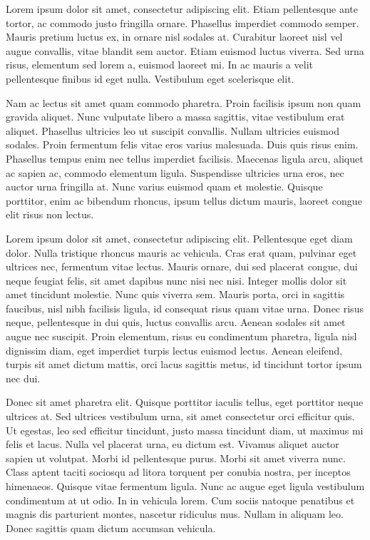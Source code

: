 \documentclass{article}
\begin{document}
\beginnumbering
\autopar

{Lorem ipsum dolor sit amet}{}, consectetur adipiscing elit.
 Etiam pellentesque ante tortor, ac commodo justo fringilla ornare.
 Phasellus imperdiet commodo semper.
 Mauris pretium luctus ex, in ornare nisl sodales at.
 Curabitur laoreet nisl vel augue convallis, vitae blandit sem auctor.
 Etiam euismod luctus viverra.
 Sed urna risus, elementum sed lorem a, euismod laoreet mi.
 In ac mauris a velit pellentesque finibus id eget nulla.
 Vestibulum eget scelerisque elit.

 {Nam}{} ac lectus sit amet quam commodo pharetra.
 Proin facilisis ipsum non quam gravida aliquet.
 Nunc vulputate libero a massa sagittis, vitae vestibulum erat aliquet.
 Phasellus ultricies leo ut suscipit convallis.
 Nullam ultricies euismod sodales.
 Proin fermentum felis vitae eros varius malesuada.
 Duis quis risus enim.
 Phasellus tempus enim nec tellus imperdiet facilisis.
 Maecenas ligula arcu, aliquet ac sapien ac, commodo elementum ligula.
 Suspendisse ultricies urna eros, nec auctor urna fringilla at.
 Nunc varius euismod quam et molestie.
 Quisque porttitor, enim ac bibendum rhoncus, ipsum tellus dictum mauris, laoreet congue elit risus non lectus.

 
Lorem ipsum dolor sit amet, consectetur adipiscing elit.
 Pellentesque eget diam dolor.
 Nulla tristique rhoncus mauris ac vehicula.
 Cras erat quam, pulvinar eget ultrices nec, fermentum vitae lectus.
 Mauris ornare, dui sed placerat congue, dui neque feugiat felis, sit amet dapibus nunc nisi nec nisi.
 Integer mollis dolor sit amet tincidunt molestie.
 Nunc quis viverra sem.
 Mauris porta, orci in sagittis faucibus, nisl nibh facilisis ligula, id consequat risus quam vitae urna.
 Donec risus neque, pellentesque in dui quis, luctus convallis arcu.
 Aenean sodales sit amet augue nec suscipit.
 Proin elementum, risus eu condimentum pharetra, ligula nisl dignissim diam, eget imperdiet turpis lectus euismod lectus.
 Aenean eleifend, turpis sit amet dictum mattis, orci lacus sagittis metus, id tincidunt tortor ipsum nec dui.

 

Donec sit amet pharetra elit.
 Quisque porttitor iaculis tellus, eget porttitor neque ultrices at.
 Sed ultrices vestibulum urna, sit amet consectetur orci efficitur quis.
 Ut egestas, leo sed efficitur tincidunt, justo massa tincidunt diam, ut maximus mi felis et lacus.
 Nulla vel placerat urna, eu dictum est.
 Vivamus aliquet auctor sapien ut volutpat.
 Morbi id pellentesque purus.
 Morbi sit amet viverra nunc.
 Class aptent taciti sociosqu ad litora torquent per conubia nostra, per inceptos himenaeos.
 Quisque vitae fermentum ligula.
 Nunc ac augue eget ligula vestibulum condimentum at ut odio.
 In in vehicula lorem.
 Cum sociis natoque penatibus et magnis dis parturient montes, nascetur ridiculus mus.
 Nullam in aliquam leo.
 Donec sagittis quam dictum accumsan vehicula.
\end{document}
